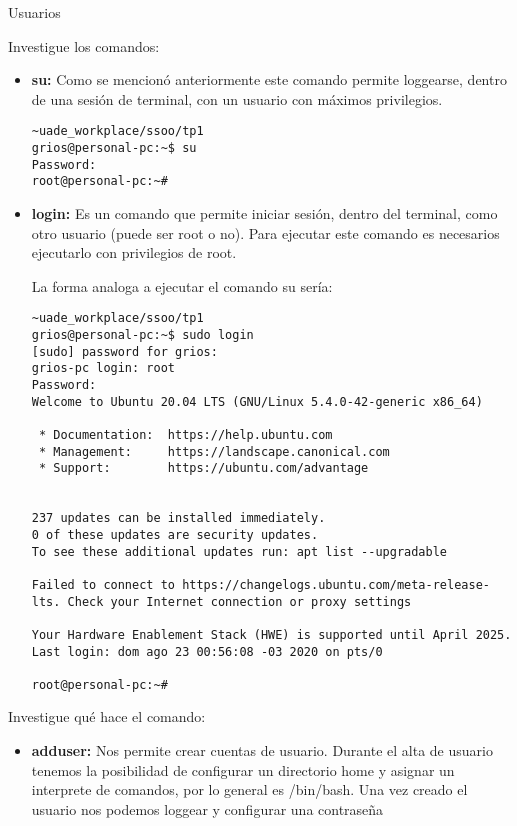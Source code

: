 \begin{section}{Usuarios}
\begin{itemize}
\end{itemize}


\begin{quoting}
Investigue los comandos:
\end{quoting}


\begin{itemize}
\item \textbf{su:}
Como se mencionó anteriormente este comando permite loggearse, dentro de una sesión de terminal, con un usuario con máximos privilegios.

\begin{lstlisting}[style=Ubuntu]
~uade_workplace/ssoo/tp1
grios@personal-pc:~$ su
Password: 
root@personal-pc:~#
\end{lstlisting}

\item \textbf{login:}
Es un comando que permite iniciar sesión, dentro del terminal, como otro usuario (puede ser root o no). Para ejecutar este comando es necesarios ejecutarlo con privilegios de root.

La forma analoga a ejecutar el comando su sería:
\begin{lstlisting}[style=Ubuntu]
~uade_workplace/ssoo/tp1
grios@personal-pc:~$ sudo login
[sudo] password for grios: 
grios-pc login: root
Password: 
Welcome to Ubuntu 20.04 LTS (GNU/Linux 5.4.0-42-generic x86_64)

 * Documentation:  https://help.ubuntu.com
 * Management:     https://landscape.canonical.com
 * Support:        https://ubuntu.com/advantage


237 updates can be installed immediately.
0 of these updates are security updates.
To see these additional updates run: apt list --upgradable

Failed to connect to https://changelogs.ubuntu.com/meta-release-lts. Check your Internet connection or proxy settings

Your Hardware Enablement Stack (HWE) is supported until April 2025.
Last login: dom ago 23 00:56:08 -03 2020 on pts/0

root@personal-pc:~# 
\end{lstlisting}
\end{itemize}


\begin{quoting}
Investigue qué hace el comando:
\end{quoting}

\begin{itemize}

\item \textbf{adduser:}
	Nos permite crear cuentas de usuario. Durante el alta de usuario tenemos la posibilidad de configurar un directorio home y asignar un interprete de comandos, por lo general es /bin/bash. Una vez creado el usuario nos podemos loggear y configurar una contraseña


\end{itemize}
\end{section}
